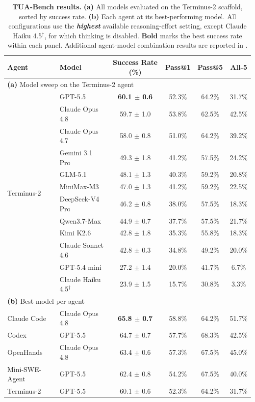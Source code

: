 \documentclass{llmxive}
\providecommand{\benchname}{\mbox{TUA-Bench}\xspace}
\providecommand{\arraystretch}{1.15}
\begin{document}
\begin{table}[t]
\centering
\small
\setlength{\tabcolsep}{10pt}
\renewcommand{\arraystretch}{1.05}
\begin{tabular}{l l c c c c}
\toprule
Agent & Model & Success Rate (\%) & Pass@1 & Pass@5 & All-5 \\
\midrule
\multicolumn{6}{l}{\textbf{(a)} Model sweep on the Terminus-2 agent} \\
\midrule
\multirow{12}{*}{Terminus-2}
 & GPT-5.5              & \textbf{60.1 $\pm$ 0.6} & 52.3\% & 64.2\% & 31.7\% \\
 & Claude Opus 4.8      & 59.7 $\pm$ 1.0 & 53.8\% & 62.5\% & 42.5\% \\
 & Claude Opus 4.7      & 58.0 $\pm$ 0.8 & 51.0\% & 64.2\% & 39.2\% \\
 & Gemini 3.1 Pro & 49.3 $\pm$ 1.8 & 41.2\% & 57.5\% & 24.2\% \\
 & GLM-5.1              & 48.1 $\pm$ 1.3 & 40.3\% & 59.2\% & 20.8\% \\
 & MiniMax-M3           & 47.0 $\pm$ 1.3 & 41.2\% & 59.2\% & 22.5\% \\
 & DeepSeek-V4 Pro      & 46.2 $\pm$ 0.8 & 38.0\% & 57.5\% & 18.3\% \\
 & Qwen3.7-Max          & 44.9 $\pm$ 0.7 & 37.7\% & 57.5\% & 21.7\% \\
 & Kimi K2.6            & 42.8 $\pm$ 1.8 & 35.3\% & 55.8\% & 18.3\% \\
 & Claude Sonnet 4.6    & 42.8 $\pm$ 0.3 & 34.8\% & 49.2\% & 20.0\% \\
 & GPT-5.4 mini         & 27.2 $\pm$ 1.4 & 20.0\% & 41.7\% & 6.7\%  \\
 & Claude Haiku 4.5$^\dagger$     & 23.9 $\pm$ 1.5 & 15.7\% & 30.8\% & 3.3\%  \\
\midrule
\multicolumn{6}{l}{\textbf{(b)} Best model per agent} \\
\midrule
Claude Code & Claude Opus 4.8 & \textbf{65.8 $\pm$ 0.7} & 58.8\% & 64.2\% & 51.7\% \\
Codex          & GPT-5.5          & 64.7 $\pm$ 0.7 & 57.7\% & 68.3\% & 42.5\% \\
OpenHands      & Claude Opus 4.8  & 63.4 $\pm$ 0.6 & 57.3\% & 67.5\% & 45.0\% \\
Mini-SWE-Agent & GPT-5.5          & 62.4 $\pm$ 0.8 & 54.2\% & 67.5\% & 40.0\% \\
Terminus-2     & GPT-5.5          & 60.1 $\pm$ 0.6 & 52.3\% & 64.2\% & 31.7\% \\
\bottomrule
\end{tabular}
\caption{\textbf{\benchname results.} \textbf{(a)} All models evaluated on the Terminus-2 scaffold, sorted by success rate. \textbf{(b)} Each agent at its best-performing model. All configurations use the \textbf{\emph{highest}} available reasoning-effort setting, except Claude Haiku 4.5$^\dagger$, for which thinking is disabled. \textbf{Bold} marks the best success rate within each panel. Additional agent-model combination results are reported in .}
\label{tab:two-panel}
\end{table}
\end{document}
